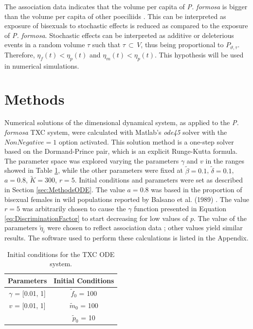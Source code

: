 	The association data indicates that the volume per capita of \textit{P. formosa} is bigger than the volume per capita of other poeciliids \cite{Balsano:Poecilia}. This can be interpreted as exposure of bisexuals to stochastic effects is reduced as compared to the exposure of \textit{P. formosa}. Stochastic effects can be interpreted as additive or deleterious events in a random volume $\tau$ such that $\tau \, \subset \, V$, thus being proportional to $P_{\vartheta, \tau}$. Therefore,  $\eta_f(t) < \eta_p(t)$ and $\eta_m(t) < \eta_p(t)$. This hypothesis will be used in numerical simulations.

	\section{Methods}	
	Numerical solutions of the dimensional dynamical system, as applied to the \textit{P. formosa} TXC system, were calculated with Matlab's \textit{ode45} solver with the $NonNegative = 1$ option activated. This solution method is a one-step solver based on the Dormand-Prince pair, which is an explicit Runge-Kutta formula. The parameter space was explored varying the parameters $\gamma$ and $v$ in the ranges showed in Table \ref{tab:ICPoecilia}, while the other parameters were fixed at $\tilde{\beta}=0.1$, $\tilde{\delta}=0.1$, $a=0.8$, $\tilde{K}=300$, $r=5$. Initial conditions and parameters were set as described in Section \ref{sec:MethodsODE}. The value $a=0.8$ was based in the proportion of bisexual females in wild populations reported by Balsano et al. (1989) \cite{Balsano:Poecilia}. The value $r=5$ was arbitrarily chosen to cause the $\gamma$ function presented in Equation \ref{eq:DiscriminationFactor} to start decreasing for low values of $p$. 
	The value of the parameters $\tilde{\eta}_i$ were chosen to reflect association data \cite{Balsano:Poecilia}; other values yield similar results.  
	The software used to perform these calculations is listed in the Appendix.
	\begin{table}
		\centering
		\caption[Initial conditions for the TXC ODE system]{Initial conditions for the TXC ODE system.}
		\label{tab:ICPoecilia}
		\begin{tabular} {|c||c|}\hline
			  \textbf{Parameters} 	&  \textbf{Initial Conditions}   \\\hline
			  $\gamma$	= [0.01, 1]	& $\tilde{f}_0$ =   100 \\\hline
			  $v$				= [0.01, 1]	&	$\tilde{m}_0$ =   100 \\\hline
			  											&	$\tilde{p}_0$ =   10 \\\hline
		\end{tabular}
	\end{table}

